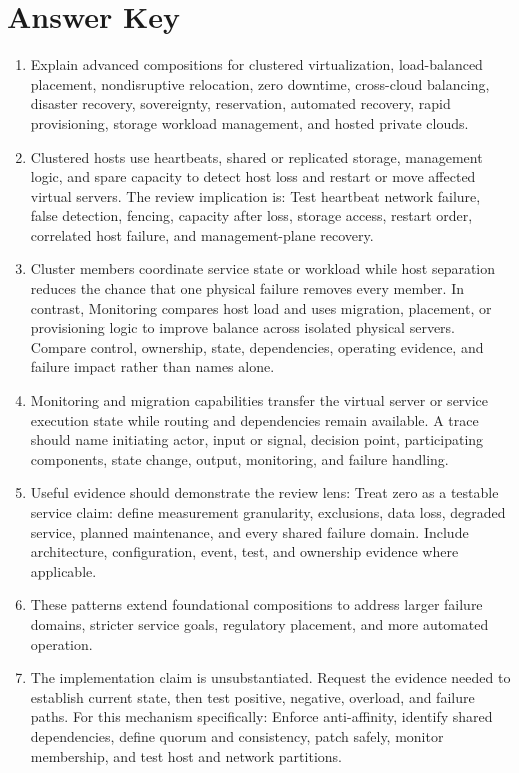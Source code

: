 \documentclass[11pt]{article}
\begin{document}
\section{Answer Key}
\begin{enumerate}
\item Explain advanced compositions for clustered virtualization, load-balanced placement, nondisruptive relocation, zero downtime, cross-cloud balancing, disaster recovery, sovereignty, reservation, automated recovery, rapid provisioning, storage workload management, and hosted private clouds.
\item Clustered hosts use heartbeats, shared or replicated storage, management logic, and spare capacity to detect host loss and restart or move affected virtual servers. The review implication is: Test heartbeat network failure, false detection, fencing, capacity after loss, storage access, restart order, correlated host failure, and management-plane recovery.
\item Cluster members coordinate service state or workload while host separation reduces the chance that one physical failure removes every member. In contrast, Monitoring compares host load and uses migration, placement, or provisioning logic to improve balance across isolated physical servers. Compare control, ownership, state, dependencies, operating evidence, and failure impact rather than names alone.
\item Monitoring and migration capabilities transfer the virtual server or service execution state while routing and dependencies remain available. A trace should name initiating actor, input or signal, decision point, participating components, state change, output, monitoring, and failure handling.
\item Useful evidence should demonstrate the review lens: Treat zero as a testable service claim: define measurement granularity, exclusions, data loss, degraded service, planned maintenance, and every shared failure domain. Include architecture, configuration, event, test, and ownership evidence where applicable.
\item These patterns extend foundational compositions to address larger failure domains, stricter service goals, regulatory placement, and more automated operation.
\item The implementation claim is unsubstantiated. Request the evidence needed to establish current state, then test positive, negative, overload, and failure paths. For this mechanism specifically: Enforce anti-affinity, identify shared dependencies, define quorum and consistency, patch safely, monitor membership, and test host and network partitions.

\end{enumerate}
\end{document}
